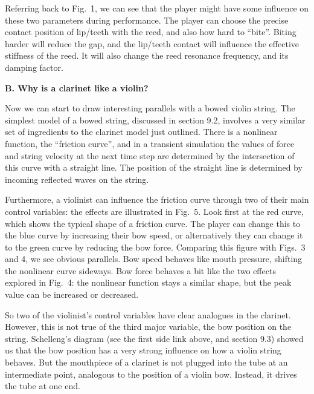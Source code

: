   Referring back to Fig.\ 1, we can see that the player might have some 
  influence on these two parameters during performance. The player can choose 
  the precise contact position of lip/teeth with the reed, and also how hard to 
  “bite”. Biting harder will reduce the gap, and the lip/teeth contact will 
  influence the effective stiffness of the reed. It will also change the reed 
  resonance frequency, and its damping factor. 

  \textbf{B. Why is a clarinet like a violin?} 

  Now we can start to draw interesting parallels with a bowed violin string. 
  The simplest model of a bowed string, discussed in section 9.2, involves a 
  very similar set of ingredients to the clarinet model just outlined. There is 
  a nonlinear function, the “friction curve”, and in a transient simulation the 
  values of force and string velocity at the next time step are determined by 
  the intersection of this curve with a straight line. The position of the 
  straight line is determined by incoming reflected waves on the string. 

  Furthermore, a violinist can influence the friction curve through two of 
  their main control variables: the effects are illustrated in Fig.\ 5. Look 
  first at the red curve, which shows the typical shape of a friction curve. 
  The player can change this to the blue curve by increasing their bow speed, 
  or alternatively they can change it to the green curve by reducing the bow 
  force. Comparing this figure with Figs.\ 3 and 4, we see obvious parallels. 
  Bow speed behaves like mouth pressure, shifting the nonlinear curve sideways. 
  Bow force behaves a bit like the two effects explored in Fig.\ 4: the 
  nonlinear function stays a similar shape, but the peak value can be increased 
  or decreased. 


  So two of the violinist’s control variables have clear analogues in the 
  clarinet. However, this is not true of the third major variable, the bow 
  position on the string. Schelleng’s diagram (see the first side link above, 
  and section 9.3) showed us that the bow position has a very strong influence 
  on how a violin string behaves. But the mouthpiece of a clarinet is not 
  plugged into the tube at an intermediate point, analogous to the position of 
  a violin bow. Instead, it drives the tube at one end. 


